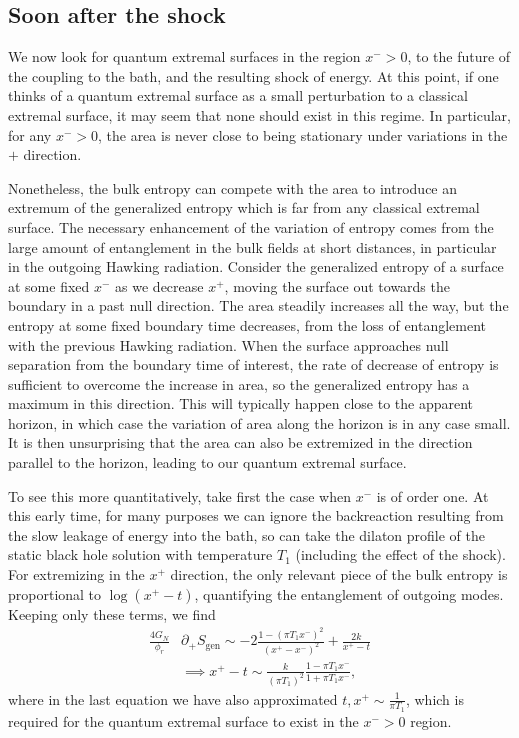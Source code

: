 \documentclass[12pt]{article}
\begin{document}
\subsection{Soon after the shock}\label{ssec:soon}

We now look for quantum extremal surfaces in the region $x^->0$, to the future of the coupling to the bath, and the resulting shock of energy. At this point, if one thinks of a quantum extremal surface as a small perturbation to a classical extremal surface, it may seem that none should exist in this regime. In particular, for any $x^->0$, the area is never close to being stationary under variations in the $+$ direction.

Nonetheless,  the bulk entropy can compete with the area to introduce an extremum of the generalized entropy which is far from any classical extremal surface. The necessary enhancement of the variation of entropy comes from the large amount of entanglement in the bulk fields at short distances, in particular in the outgoing Hawking radiation. Consider the generalized entropy of a surface at some fixed $x^-$ as we decrease $x^+$, moving the surface out towards the boundary in a past null direction. The area steadily increases all the way, but the entropy at some fixed boundary time decreases, from the loss of entanglement with the previous Hawking radiation. When the surface approaches null separation from the boundary time of interest, the rate of decrease of entropy is sufficient to overcome the increase in area, so the generalized entropy has a maximum in this direction. This will typically happen close to the apparent horizon, in which case the variation of area along the horizon is in any case small. It is then unsurprising that the area can also be extremized in the direction parallel to the horizon, leading to our quantum extremal surface.

To see this more quantitatively, take first the case when $x^-$ is of order one. At this early time, for many purposes we can ignore the backreaction resulting from the slow leakage of energy into the bath, so can take the dilaton profile of the static black hole solution with temperature $T_1$ (including the effect of the shock). For extremizing in the $x^+$ direction, the only relevant piece of the bulk entropy is proportional to $\log(x^+-t)$, quantifying the entanglement of outgoing modes. Keeping only these terms, we find
\begin{align}
	\frac{4G_N}{\phi_r}&\partial_+ S_\text{gen} \sim -2 \frac{1-(\pi T_1 x^-)^2}{(x^+-x^-)^2} +\frac{2k}{x^+-t} \nonumber \\
	&\implies x^+ -t \sim \frac{k}{(\pi T_1)^2}\frac{1-\pi T_1 x^-}{1+\pi T_1 x^-}, \label{eq:earlyPlusVar}
\end{align}
where in the last equation we have also approximated $t,x^+\sim \frac{1}{\pi T_1}$, which is required for the quantum extremal surface to exist in the $x^- >0$ region.
\end{document}
